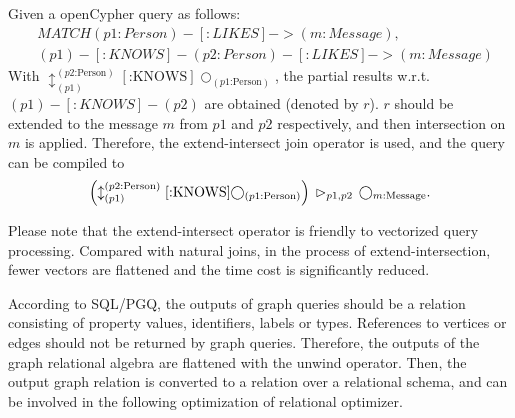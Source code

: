 Given a openCypher query as follows:
\begin{equation}
    \begin{split}
        & MATCH (p1:Person)-[:LIKES]->(m:Message), \\
        & (p1)-[:KNOWS]-(p2:Person)-[:LIKES]->(m:Message)
    \end{split}
\end{equation}
With $\updownarrow^{(p2\text{:Person})}_{(p1)}[\text{:KNOWS}]\bigcirc_{(p1\text{:Person})}$, the partial results w.r.t.~$(p1)-[:KNOWS]-(p2)$ are obtained (denoted by $r$). 
$r$ should be extended to the message $m$ from $p1$ and $p2$ respectively, and then intersection on $m$ is applied.
Therefore, the extend-intersect join operator is used, and the query can be compiled to
\begin{equation}
    \left(\updownarrow^{(p2\text{:Person})}_{(p1)}[\text{:KNOWS}]\bigcirc_{(p1\text{:Person})}\right) \hspace{0.2em} \rhd_{p1, p2} \hspace{0.2em} \bigcirc_{m\text{:Message}}.
\end{equation}

Please note that the extend-intersect operator is friendly to vectorized query processing.
Compared with natural joins, in the process of extend-intersection, fewer vectors are flattened and the time cost is significantly reduced.

According to SQL/PGQ, the outputs of graph queries should be a relation consisting of property values, identifiers, labels or types.
References to vertices or edges should not be returned by graph queries.
Therefore, the outputs of the graph relational algebra are flattened with the unwind operator.
Then, the output graph relation is converted to a relation over a relational schema, and can be involved in the following optimization of relational optimizer.

